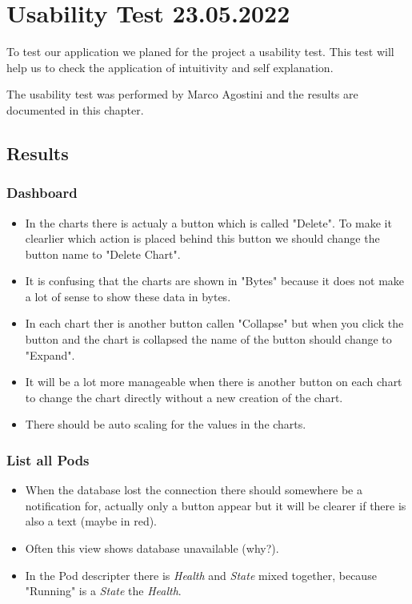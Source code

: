 \chapter{Usability Test 23.05.2022}
To test our application we planed for the project a usability test. This test will help us to check the application of intuitivity and self explanation.

The usability test was performed by Marco Agostini and the results are documented in this chapter.

\section{Results}
\subsection{Dashboard}
\begin{itemize}
    \item In the charts there is actualy a button which is called "Delete". To make it clearlier which action is placed behind this button we should change the button name to "Delete Chart".
    \item It is confusing that the charts are shown in "Bytes" because it does not make a lot of sense to show these data in bytes.
    \item In each chart ther is another button callen "Collapse" but when you click the button and the chart is collapsed the name of the button should change to "Expand".
    \item It will be a lot more manageable when there is another button on each chart to change the chart directly without a new creation of the chart.
    \item There should be auto scaling for the values in the charts.
\end{itemize}

\subsection{List all Pods}
\begin{itemize}
    \item When the database lost the connection there should somewhere be a notification for, actually only a button appear but it will be clearer if there is also a text (maybe in red).
    \item Often this view shows database unavailable (why?).
    \item In the Pod descripter there is \textit{Health} and \textit{State} mixed together, because "Running" is a \textit{State} the \textit{Health}.
\end{itemize}

